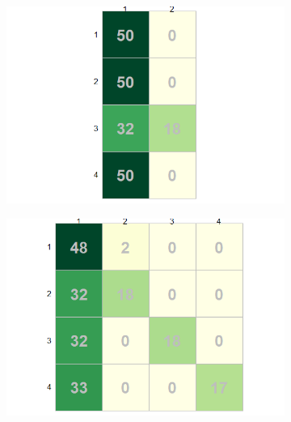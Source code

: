 \documentclass[12pt]{article}
\begin{document}
\begin{figure}[h!]
  \begin{subfigure}[b]{0.33\linewidth}
      \centering
      \includegraphics[width=\textwidth]{../images/project2/confMat_2.png}
   \caption{}\label{fig:confMat_2}
  \end{subfigure}%
  \begin{subfigure}[b]{0.33\linewidth}
      \centering
   \includegraphics[width=\textwidth]{../images/project2/confMat_4.png}
   \caption{}\label{fig:confMat_4}
  \end{subfigure}%
  \begin{subfigure}[b]{0.33\linewidth}
    \centering

\end{subfigure}
\end{figure}
\end{document}
